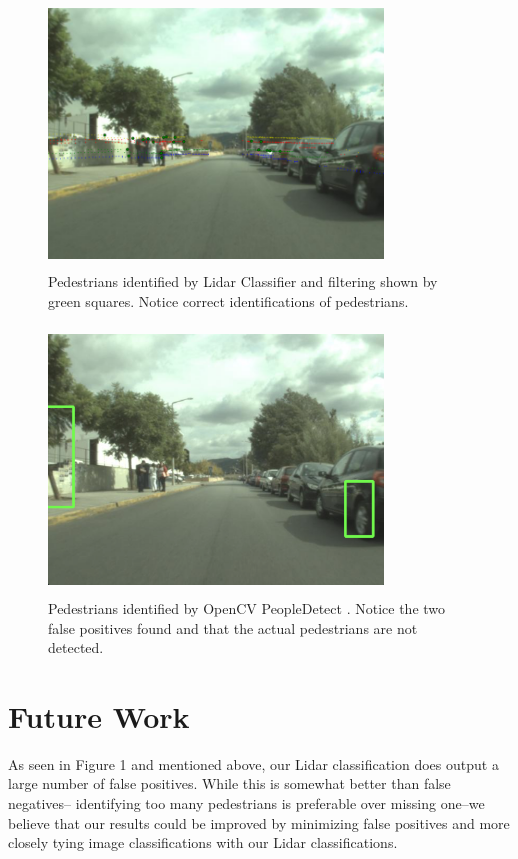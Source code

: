 \documentclass[10pt,twocolumn,letterpaper]{article}
\begin{document}
  \begin{figure}
    \includegraphics[height=2.8in, width=3.5in]{images/sample2lidar.png}
    \caption{ Pedestrians identified by Lidar Classifier and filtering shown
    by green squares. Notice correct identifications of pedestrians. }
  \end{figure}

    \begin{figure}
    \includegraphics[height=2.8in, width=3.5in]{images/sample2cv.png}
    \caption{ Pedestrians identified by OpenCV PeopleDetect \cite{opencv}.
    Notice the two false positives found and that the actual pedestrians are
    not detected. }
  \end{figure}

\section{Future Work}
  As seen in Figure 1 and mentioned above, our Lidar classification does output a
  large number of false positives. While this is somewhat better than false negatives--
  identifying too many pedestrians is preferable over missing one--we believe that
  our results could be improved by minimizing false positives and more closely
  tying image classifications with our Lidar classifications.
\end{document}
